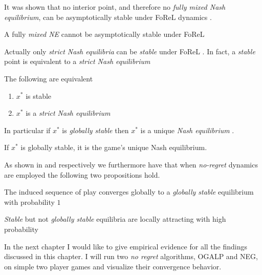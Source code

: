 It was shown that no interior point, and therefore no \textit{fully mixed Nash equilibrium}, can be asymptotically stable under FoReL dynamics \cite[Theorem 1]{flokas}. 

\begin{proposition}\label{prop:noInteriorStable}
    A fully \textit{mixed NE} cannot be asymptotically stable under FoReL
\end{proposition}

Actually only \textit{strict Nash equilibria} can be \textit{stable} under FoReL \cite[Theorem 2]{flokas}. In fact, a \textit{stable} point is equivalent to a \textit{strict Nash equilibrium} \cite[Prop. 5.2]{mertikopoulos}

\begin{proposition}\label{prop:StrictStableEquivalent}
    The following are equivalent
    \begin{enumerate}
        \item $x^*$ is stable
        \item $x^*$ is a \textit{strict Nash equilibrium}
    \end{enumerate}
\end{proposition}
    
In particular if $x^*$ is \textit{globally stable} then $x^*$ is a unique \textit{Nash equilibrium} \cite[Prop.2.5]{mertikopoulos}.

\begin{proposition}\label{prop:GloballyStableUniqueNE}
    If $x^*$ is globally stable, it is the game’s unique Nash equilibrium.
\end{proposition}

As shown in \cite[Theorem 4.7]{mertikopoulos} and \cite[Theorem 4.11]{mertikopoulos} respectively we furthermore have that when \textit{no-regret} dynamics are employed the following two propositions hold.

\begin{proposition}\label{prop:globalConvergence}
    The induced sequence of play converges globally to a \textit{globally stable} equilibrium with probability $1$
\end{proposition}

\begin{proposition}\label{prop:localConvergence}
    \textit{Stable}  but not \textit{globally stable} equilibria are locally attracting with high probability
\end{proposition}


In the next chapter I would like to give empirical evidence for all the findings discussed in this chapter. I will run two \textit{no regret} algorithms, OGALP and NEG, on simple two player games and visualize their convergence behavior. 
